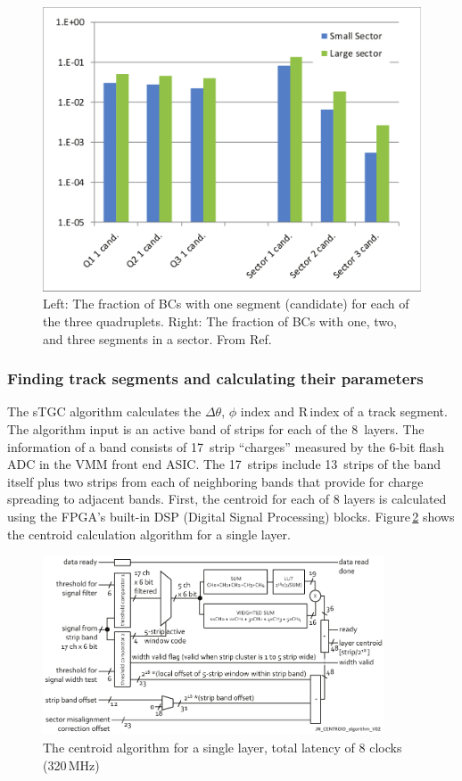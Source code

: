 \begin{figure}[h]
\centering
   \includegraphics[width=.55\textwidth]{figures/DL_segRates_V01.pdf}
   \caption{Left: The fraction of BCs with one segment (candidate) for each of the three quadruplets.
           Right: The fraction of BCs with one, two, and three segments in a sector. From Ref.~\cite{LellouchRates}}
   \label{fig:DL_segRates}
\end{figure}

\subsubsection{Finding track segments and calculating their parameters}

The sTGC algorithm calculates the $\Delta\theta$, $\phi$ index and R\,index of a track segment.
The algorithm input is an active band of strips for each of the 8~layers.
The information of a band consists of 17~strip ``charges'' measured by the 6-bit flash ADC in the VMM front end ASIC.
The 17~strips include 13~strips of the band itself plus two strips from each of neighboring bands
that provide for charge spreading to adjacent bands.
First, the centroid for each of 8 layers is calculated using the FPGA's built-in DSP (Digital Signal Processing) blocks.
Figure\,\ref{fig:JN_CENTROID_algorithm} shows the centroid calculation algorithm for a single layer.

\begin{figure}[h]
   \centering
   \includegraphics[width=0.9\textwidth]{figures/JN_CENTROID_algorithm_V02.pdf}
   \caption{The centroid algorithm for a single layer, total latency of 8 clocks (320\,MHz)}
   \label{fig:JN_CENTROID_algorithm}
\end{figure}

